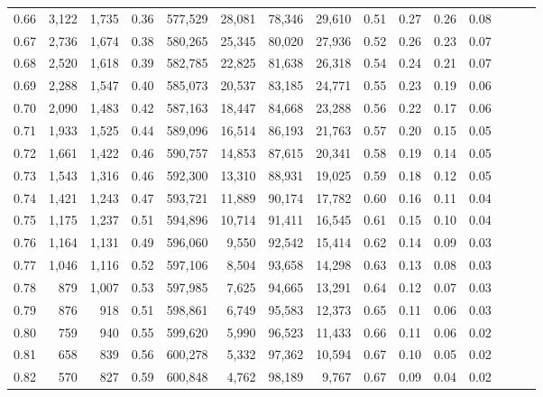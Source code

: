 \begin{tabular}{rrrrrrrrrrrrrrr}
0.66 &   3,122 &  1,735 &  0.36 &  577,529 &   28,081 &   78,346 &   29,610 &  0.51 &  0.27 &  0.26 &      0.08 \\
0.67 &   2,736 &  1,674 &  0.38 &  580,265 &   25,345 &   80,020 &   27,936 &  0.52 &  0.26 &  0.23 &      0.07 \\
0.68 &   2,520 &  1,618 &  0.39 &  582,785 &   22,825 &   81,638 &   26,318 &  0.54 &  0.24 &  0.21 &      0.07 \\
0.69 &   2,288 &  1,547 &  0.40 &  585,073 &   20,537 &   83,185 &   24,771 &  0.55 &  0.23 &  0.19 &      0.06 \\
0.70 &   2,090 &  1,483 &  0.42 &  587,163 &   18,447 &   84,668 &   23,288 &  0.56 &  0.22 &  0.17 &      0.06 \\
0.71 &   1,933 &  1,525 &  0.44 &  589,096 &   16,514 &   86,193 &   21,763 &  0.57 &  0.20 &  0.15 &      0.05 \\
0.72 &   1,661 &  1,422 &  0.46 &  590,757 &   14,853 &   87,615 &   20,341 &  0.58 &  0.19 &  0.14 &      0.05 \\
0.73 &   1,543 &  1,316 &  0.46 &  592,300 &   13,310 &   88,931 &   19,025 &  0.59 &  0.18 &  0.12 &      0.05 \\
0.74 &   1,421 &  1,243 &  0.47 &  593,721 &   11,889 &   90,174 &   17,782 &  0.60 &  0.16 &  0.11 &      0.04 \\
0.75 &   1,175 &  1,237 &  0.51 &  594,896 &   10,714 &   91,411 &   16,545 &  0.61 &  0.15 &  0.10 &      0.04 \\
0.76 &   1,164 &  1,131 &  0.49 &  596,060 &    9,550 &   92,542 &   15,414 &  0.62 &  0.14 &  0.09 &      0.03 \\
0.77 &   1,046 &  1,116 &  0.52 &  597,106 &    8,504 &   93,658 &   14,298 &  0.63 &  0.13 &  0.08 &      0.03 \\
0.78 &     879 &  1,007 &  0.53 &  597,985 &    7,625 &   94,665 &   13,291 &  0.64 &  0.12 &  0.07 &      0.03 \\
0.79 &     876 &    918 &  0.51 &  598,861 &    6,749 &   95,583 &   12,373 &  0.65 &  0.11 &  0.06 &      0.03 \\
0.80 &     759 &    940 &  0.55 &  599,620 &    5,990 &   96,523 &   11,433 &  0.66 &  0.11 &  0.06 &      0.02 \\
0.81 &     658 &    839 &  0.56 &  600,278 &    5,332 &   97,362 &   10,594 &  0.67 &  0.10 &  0.05 &      0.02 \\
0.82 &     570 &    827 &  0.59 &  600,848 &    4,762 &   98,189 &    9,767 &  0.67 &  0.09 &  0.04 &      0.02 \\

\end{tabular}
